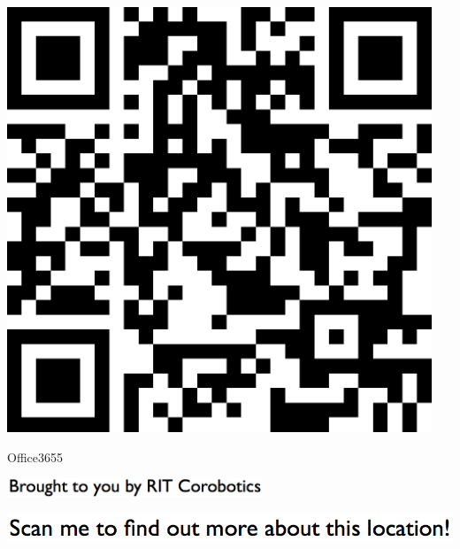 \documentclass[letterpaper]{article}
\begin{document}
 \begingroup 
 \centerline{\includegraphics[scale=1,width=5in,height=5in]{Office3655.png}} 
 \endgroup 
 \vspace*{\fill} 

 \hfill{\small Office3655} 

  \vspace{0.7in} 
 
 \centerline{\includegraphics[scale=1,width=3in]{text-bottom.png}} 
 
 \pagebreak 
{} 
 \vspace*{\fill} 
 
  \centerline{\includegraphics[scale=1,width=6in]{text-top.png}} 
 
 \vspace{0.5in} 
 
\end{document}
